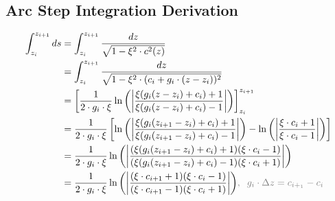\documentclass{article}
\begin{document}
\subsection{Arc Step Integration Derivation}
\begin{align*}
	\int_{z_i}^{z_{i+1}}ds & = \int_{z_i}^{z_{i+1}}\frac{dz}{\sqrt{1-\xi^2\cdot c^2(z)}}                                                                                                                                                            \\
	                       & = \int_{z_i}^{z_{i+1}}\frac{dz}{\sqrt{1-\xi^2\cdot (c_i + g_i\cdot(z - z_i))^2}}                                                                                                                                       \\
	                       & = \left[ \frac{1}{2\cdot g_i \cdot \xi}\ln{\left(\left| \frac{\xi(g_i(z-z_i)+c_i)+1}{\xi(g_i(z-z_i) + c_i)-1}\right|\right)} \right]_{z_i}^{z_{i+1}}                                                                   \\
	                       & = \frac{1}{2\cdot g_i\cdot\xi}\left[ \ln{\left(\left| \frac{\xi(g_i(z_{i+1}-z_i)+c_i)+1}{\xi(g_i(z_{i+1}-z_i) + c_i)-1}\right|\right)} - \ln{\left(\left| \frac{\xi\cdot c_i+1}{\xi \cdot c_i-1}\right|\right)}\right] \\
	                       & = \frac{1}{2\cdot g_i\cdot\xi}\ln{\left(\left| \frac{(\xi(g_i(z_{i+1}-z_i)+c_i)+1)(\xi\cdot c_i -1)}{(\xi(g_i(z_{i+1}-z_i) + c_i)-1)(\xi\cdot c_i +1)}\right|\right)}                                                  \\
	                       & = \frac{1}{2\cdot g_i\cdot\xi}\ln{\left(\left| \frac{(\xi\cdot c_{i+1}+1)(\xi\cdot c_i -1)}{(\xi\cdot c_{i+1}-1)(\xi\cdot c_i +1)}\right|\right)}\textcolor{gray}{,\;\;g_{i}\cdot\Delta z=c_{i+_1}-c_i}
\end{align*}
\end{document}
